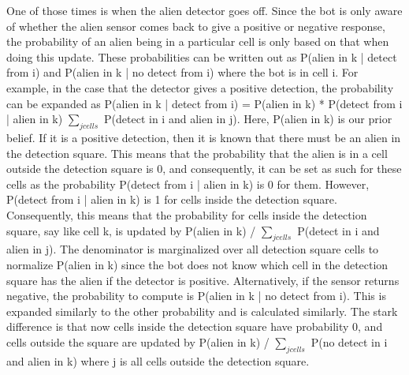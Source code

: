 \documentclass[11pt]{article}
\begin{document}
One of those times is when the alien detector goes off. Since the bot is only aware of whether the alien sensor comes back to give a positive or negative response, the probability of an alien being in a particular cell is only based on that when doing this update. These probabilities can be written out as P(alien in k | detect from i) and P(alien in k | no detect from i) where the bot is in cell i. For example, in the case that the detector gives a positive detection, the probability can be expanded as P(alien in k | detect from i) = P(alien in k) * P(detect from i | alien in k) $\sum_{j cells}$ P(detect in i and alien in j). Here, P(alien in k) is our prior belief. If it is a positive detection, then it is known that there must be an alien in the detection square. This means that the probability that the alien is in a cell outside the detection square is 0, and consequently, it can be set as such for these cells as the probability P(detect from i | alien in k) is 0 for them. However, P(detect from i | alien in k) is 1 for cells inside the detection square.
Consequently, this means that the probability for cells inside the detection square, say like cell k, is updated by P(alien in k) / $\sum_{j cells}$ P(detect in i and alien in j). The denominator is marginalized over all detection square cells to normalize P(alien in k) since the bot does not know which cell in the detection square has the alien if the detector is positive. Alternatively, if the sensor returns negative, the probability to compute is P(alien in k | no detect from i). This is expanded similarly to the other probability and is calculated similarly. The stark difference is that now cells inside the detection square have probability 0, and cells outside the square are updated by P(alien in k) / $\sum_{j cells}$ P(no detect in i and alien in k) where j is all cells outside the detection square.   

\medskip
\end{document}
